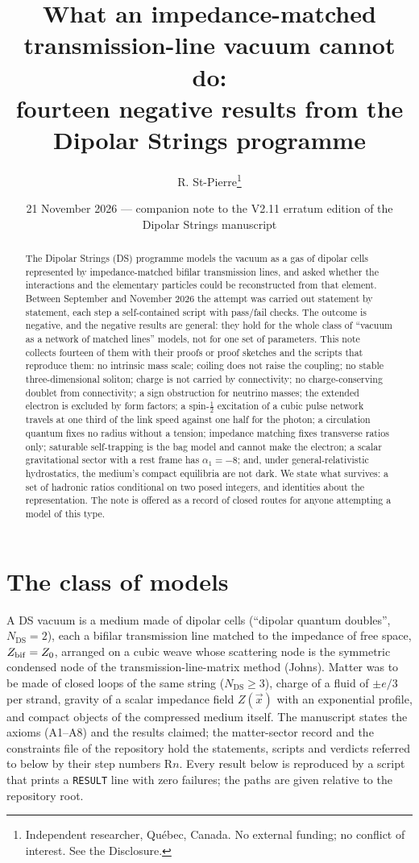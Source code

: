 \documentclass[11pt,a4paper]{article}
\title{\textbf{What an impedance-matched transmission-line vacuum cannot do:}\\ \large fourteen negative results from the Dipolar Strings programme}
\author{R. St-Pierre\thanks{Independent researcher, Qu\'ebec, Canada. No external funding; no conflict of interest. See the Disclosure.}}
\date{21 November 2026 --- companion note to the V2.11 erratum edition of the Dipolar Strings manuscript}
\newcommand{\Ncd}{\ensuremath{N_{\mathrm{DS}}}}
\begin{document}
\maketitle

\begin{abstract}
\noindent The Dipolar Strings (DS) programme models the vacuum as a gas of dipolar cells represented by impedance-matched bifilar transmission lines, and asked whether the interactions and the elementary particles could be reconstructed from that element. Between September and November 2026 the attempt was carried out statement by statement, each step a self-contained script with pass/fail checks. The outcome is negative, and the negative results are general: they hold for the whole class of ``vacuum as a network of matched lines'' models, not for one set of parameters. This note collects fourteen of them with their proofs or proof sketches and the scripts that reproduce them: no intrinsic mass scale; coiling does not raise the coupling; no stable three-dimensional soliton; charge is not carried by connectivity; no charge-conserving doublet from connectivity; a sign obstruction for neutrino masses; the extended electron is excluded by form factors; a spin-$\tfrac12$ excitation of a cubic pulse network travels at one third of the link speed against one half for the photon; a circulation quantum fixes no radius without a tension; impedance matching fixes transverse ratios only; saturable self-trapping is the bag model and cannot make the electron; a scalar gravitational sector with a rest frame has $\alpha_1 = -8$; and, under general-relativistic hydrostatics, the medium's compact equilibria are not dark. We state what survives: a set of hadronic ratios conditional on two posed integers, and identities about the representation. The note is offered as a record of closed routes for anyone attempting a model of this type.
\end{abstract}

\section{The class of models}
A DS vacuum is a medium made of dipolar cells (``dipolar quantum doubles'', $\Ncd = 2$), each a bifilar transmission line matched to the impedance of free space, $Z_{\rm bif} = Z_0$, arranged on a cubic weave whose scattering node is the symmetric condensed node of the transmission-line-matrix method (Johns). Matter was to be made of closed loops of the same string ($\Ncd \ge 3$), charge of a fluid of $\pm e/3$ per strand, gravity of a scalar impedance field $Z(\vec x)$ with an exponential profile, and compact objects of the compressed medium itself. The manuscript \cite{ds_v210} states the axioms (A1--A8) and the results claimed; the matter-sector record \cite{ds_matter} and the constraints file of the repository \cite{ds_repo} hold the statements, scripts and verdicts referred to below by their step numbers R$n$. Every result below is reproduced by a script that prints a \texttt{RESULT} line with zero failures; the paths are given relative to the repository root.
\end{document}

